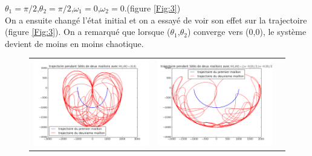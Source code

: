 \documentclass[a4paper,8pt,french,fleqn]{article}
\begin{document}
$\theta_1=\pi/2$,$\theta_2=\pi/2$,$\omega_1=0$,$\omega_2=0$.(figure \ref{Fig:3})\\
On a ensuite changé l'état initial et on a essayé de voir son effet sur la trajectoire (figure \ref{Fig:3}). On a remarqué que lorsque ($\theta_1$,$\theta_2$) converge vers ($0$,$0$), le système devient de moins en moins chaotique. \\
\begin{figure}[h]
\begin{tabular}{ccc}
\includegraphics[scale=0.29]{images/deux_maillon.png}   &
\includegraphics[scale=0.29]{images/deux_maillon_1.png} &

\end{tabular}
\end{figure}
\end{document}
